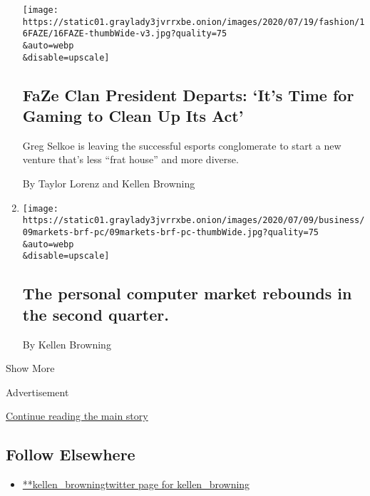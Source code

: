 \begin{enumerate}
  \texttt{[image: https://static01.graylady3jvrrxbe.onion/images/2020/07/19/fashion/16FAZE/16FAZE-thumbWide-v3.jpg?quality=75\\\&auto=webp\\\&disable=upscale]}

  \hypertarget{faze-clan-president-departs-its-time-for-gaming-to-clean-up-its-act}{%
  \subsection{FaZe Clan President Departs: `It's Time for Gaming to
  Clean Up Its
  Act'}\label{faze-clan-president-departs-its-time-for-gaming-to-clean-up-its-act}}

  Greg Selkoe is leaving the successful esports conglomerate to start a
  new venture that's less ``frat house'' and more diverse.

  By Taylor Lorenz and Kellen Browning
\item
  \href{/live/2020/07/09/business/stock-market-today-coronavirus/personal-computer-market-rebounds-in-second-quarter}{}

  \texttt{[image: https://static01.graylady3jvrrxbe.onion/images/2020/07/09/business/09markets-brf-pc/09markets-brf-pc-thumbWide.jpg?quality=75\\\&auto=webp\\\&disable=upscale]}

  \hypertarget{the-personal-computer-market-rebounds-in-the-second-quarter}{%
  \subsection{The personal computer market rebounds in the second
  quarter.}\label{the-personal-computer-market-rebounds-in-the-second-quarter}}

  By Kellen Browning
\end{enumerate}

Show More

Advertisement

\protect\hyperlink{after-mid2}{Continue reading the main story}

\hypertarget{follow-elsewhere}{%
\subsection{Follow Elsewhere}\label{follow-elsewhere}}

\begin{itemize}
\tightlist
\item
  \href{https://twitter.com/kellen_browning}{**kellen\_browningtwitter
  page for kellen\_browning}
\end{itemize}

